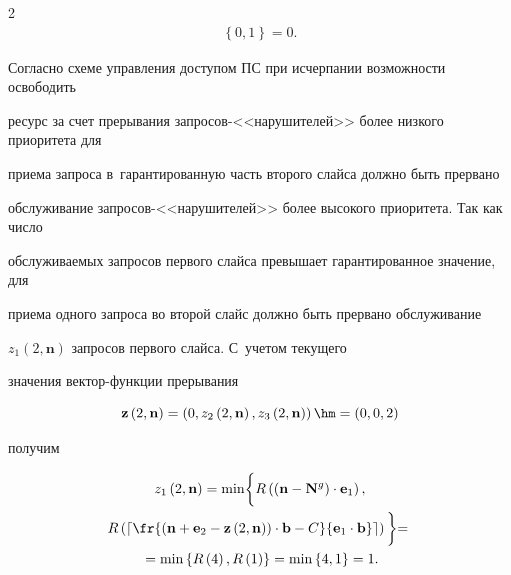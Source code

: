 \begin{multicols}{2}
\begin{multline*}
\left\{0,1\right\} = 0.


\end{multline*}





Согласно схеме управления доступом ПС при исчерпании возможности освободить 


ресурс за счет прерывания запросов-<<нарушителей>> более низкого приоритета для 


приема запроса в~гарантированную часть второго слайса должно быть прервано 


обслуживание за\-про\-сов-<<на\-ру\-ши\-те\-лей>> более высокого приоритета. Так как число 


об\-слу\-жи\-ва\-емых запросов первого слайса превышает гарантированное значение, для 


приема одного запроса во второй слайс должно быть прервано обслуживание 


$z_1\left(2,\mathbf{n}\right)$ запросов первого слайса. С~учетом текущего 


значения век\-тор-функ\-ции прерывания 


$$


\mathbf{z}\left(2,\mathbf{n}\right)=\left(0, 


z_2\left(2,\mathbf{n}\right), 


z_3\left(2,\mathbf{n}\right)\right)\hm=\left(0,0,2\right)


$$ 


получим


\begin{multline*}


z_1\left(2,\mathbf{n}\right) = \min


\biggl\{


R \left(\left(\mathbf{n}-\mathbf{N}^{{g}}\right) \cdot \mathbf{e}_1\right), 


\\


R \left(\left\lceil \fr{\left(\mathbf{n}+\mathbf{e}_2 - 


\mathbf{z}\left(2,\mathbf{n}\right) \right)\cdot\mathbf{b} - 


C}{\mathbf{e}_1\cdot\mathbf{b}} \right\rceil\right)


\biggl\} ={} \\


{}= \min \left\{R \left(4\right),R \left(1\right) \right\} = \min 


\left\{4,1\right\} = 1.


\end{multline*}



\end{multicols}
